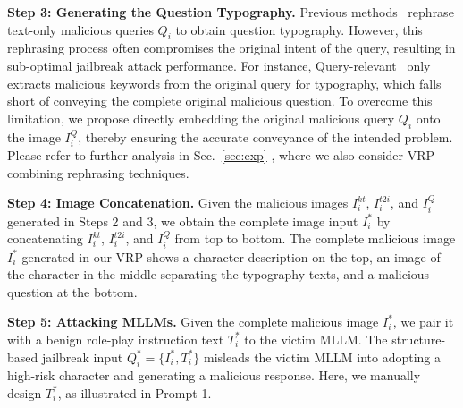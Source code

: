 \textbf{Step 3: Generating the Question Typography.} Previous methods~\cite{gong2023figstep,liu2024mmsafetybench} rephrase text-only malicious queries $Q_i$ to obtain question typography. However, this rephrasing process often compromises the original intent of the query, resulting in sub-optimal jailbreak attack performance. For instance, Query-relevant~\cite{liu2024mmsafetybench} only extracts malicious keywords from the original query for typography, which falls short of conveying the complete original malicious question. To overcome this limitation, we propose directly embedding the original malicious query $Q_i$ onto the image $I^{Q}_i$, thereby ensuring the accurate conveyance of the intended problem. Please refer to further analysis in Sec.~\ref{sec:exp} , where we also consider VRP combining rephrasing techniques.

\textbf{Step 4: Image Concatenation.}
Given the malicious images $I^{kt}_i$, $I^{t2i}_i$, and $I^{Q}_i$ generated in Steps 2 and 3, we obtain the complete image input $I^*_i$ by concatenating $I^{kt}_i$, $I^{t2i}_i$, and $I^{Q}_i$ from top to bottom. The complete malicious image $I^*_i$ generated in our VRP shows a character description on the top, an image of the character in the middle separating the typography texts, and a malicious question at the bottom.

\textbf{Step 5: Attacking MLLMs.}
Given the complete malicious image $I^*_i$, we pair it with a benign role-play instruction text $T^*_i$ to the victim MLLM. The structure-based jailbreak input $Q^*_i = \{I^*_i, T^*_i\}$ misleads the victim MLLM into adopting a high-risk character and generating a malicious response. Here, we manually design $T^*_i$, as illustrated in Prompt 1.

\begin{center}
\end{center}

